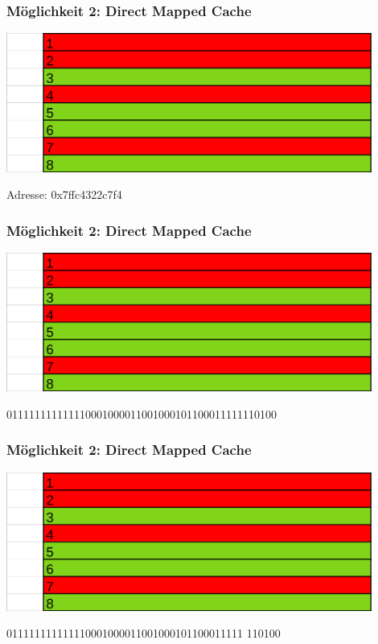 \documentclass{beamer}
\begin{document}
\begin{frame}
\frametitle{M\"oglichkeit 2: Direct Mapped Cache}
\centerline{\includegraphics[width=12cm]{fac1.png}}
Adresse: 0x7ffc4322c7f4
\end{frame}

%
\begin{frame}
\frametitle{M\"oglichkeit 2: Direct Mapped Cache}
\centerline{\includegraphics[width=12cm]{fac1.png}}
011111111111110001000011001000101100011111110100
\end{frame}

% 
%
\begin{frame}
\frametitle{M\"oglichkeit 2: Direct Mapped Cache}
\centerline{\includegraphics[width=12cm]{fac1.png}}
011111111111110001000011001000101100011111 {\color{orange}110100}
\end{frame}
\end{document}

